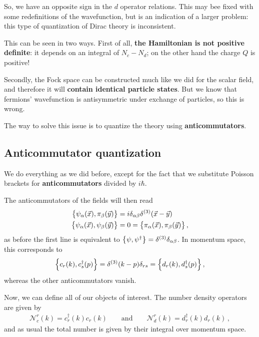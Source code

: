 \documentclass[main.tex]{subfiles}
\begin{document}
So, we have an opposite sign in the \(d\) operator relations. This may bee fixed with some redefinitions of the wavefunction, but is an indication of a larger problem: this type of quantization of Dirac theory is inconsistent. 

This can be seen in two ways. First of all, \textbf{the Hamiltonian is not positive definite}: it depends on an integral of \(N_c - N_d\); on the other hand the charge \(Q\) is positive!

Secondly, the Fock space can be constructed much like we did for the scalar field, and therefore it will \textbf{contain identical particle states}. But we know that fermions' wavefunction is antisymmetric under exchange of particles, so this is wrong. 

The way to solve this issue is to quantize the theory using \textbf{anticommutators}. 

\subsection{Anticommutator quantization}

We do everything as we did before, except for the fact that we substitute Poisson brackets for \textbf{anticommutators} divided by \(i \hbar\).

The anticommutators of the fields will then read 
%
\begin{align}
\qty{\psi_{\alpha } (\vec{x}), \pi_{\beta } (\vec{y})} &= i \delta_{\alpha \beta } \delta^{(3)} (\vec{x}-\vec{y})  \\
\qty{\psi_{\alpha }(\vec{x}), \psi_{\beta }(\vec{y})} 
&= 0 = 
\qty{\pi_{\alpha }(\vec{x}), \pi_{\beta }(\vec{y})} 
\,,
\end{align}
%
as before the first line is equivalent to \(\qty{\psi, \psi ^\dag} = \delta^{(3)} \delta_{\alpha \beta }\).
In momentum space, this corresponds to 
%
\begin{align}
\qty{c_r (k), c_s ^\dag (p)} = \delta^{(3)} (k-p) \delta_{rs} = \qty{d_r (k), d_s ^\dag (p)}
\,,
\end{align}
%
whereas the other anticommutators vanish. 


Now, we can define all of our objects of interest. The number density operators are given by
%
\begin{align}
\mathscr{N}^{r}_{c} (k) = c ^\dag_{r} (k) c_r (k) \qquad \text{and} \qquad
\mathscr{N}^{r}_{d} (k) = d ^\dag_{r} (k) d_r (k)
\,,
\end{align}
%
and as usual the total number is given by their integral over momentum space. 
\end{document}
